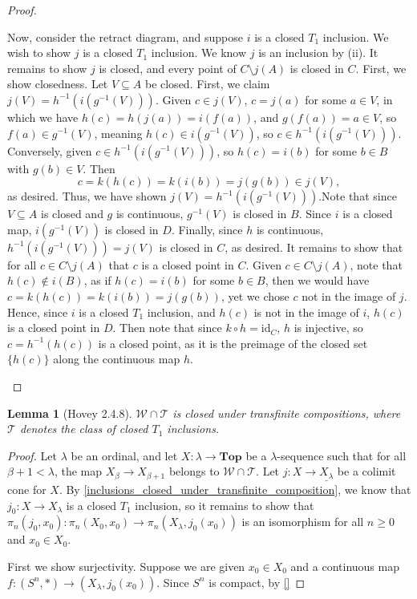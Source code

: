 \documentclass{amsart}
\theoremstyle{plain}
\newtheorem{lemma}[theorem]{Lemma}
\theoremstyle{definition}
\newcommand{\Top}{\mbf{Top}}
\newcommand{\sseq}{\subseteq}
\newcommand{\0}{\mathbf{0}}
\newcommand{\id}{\mathrm{id}}
\newcommand{\cT}{\mathcal T}
\newcommand{\cW}{\mathcal W}
\newcommand{\mbf}[1]{\mathbf{#1}}
\newcommand{\ul}{\underline}
\renewcommand{\(}{\left(}
\renewcommand{\)}{\right)}
\begin{document}
\begin{proof}
\begin{enumerate}[label=(\roman*),listparindent=\parindent,parsep=0pt]
    Now, consider the retract diagram, and suppose $i$ is a closed $T_1$ inclusion. We wish to show $j$ is a closed $T_1$ inclusion. We know $j$ is an inclusion by (ii). It remains to show $j$ is closed, and every point of $C\setminus j(A)$ is closed in $C$. First, we show closedness. Let $V\sseq A$ be closed. First, we claim $j(V)=h^{-1}(i(g^{-1}(V)))$. Given $c\in j(V)$, $c=j(a)$ for some $a\in V$, in which we have $h(c)=h(j(a))=i(f(a))$, and $g(f(a))=a\in V$, so $f(a)\in g^{-1}(V)$, meaning $h(c)\in i(g^{-1}(V))$, so $c\in h^{-1}(i(g^{-1}(V)))$. Conversely, given $c\in h^{-1}(i(g^{-1}(V)))$, so $h(c)=i(b)$ for some $b\in B$ with $g(b)\in V$. Then
    \[c=k(h(c))=k(i(b))=j(g(b))\in j(V),\]
    as desired. Thus, we have shown $j(V)=h^{-1}(i(g^{-1}(V)))$.Note that since $V\sseq A$ is closed and $g$ is continuous, $g^{-1}(V)$ is closed in $B$. Since $i$ is a closed map, $i(g^{-1}(V))$ is closed in $D$. Finally, since $h$ is continuous, $h^{-1}(i(g^{-1}(V)))=j(V)$ is closed in $C$, as desired. It remains to show that for all $c\in C\setminus j(A)$ that $c$ is a closed point in $C$. Given $c\in C\setminus j(A)$, note that $h(c)\notin i(B)$, as if $h(c)=i(b)$ for some $b\in B$, then we would have $c=k(h(c))=k(i(b))=j(g(b))$, yet we chose $c$ not in the image of $j$. Hence, since $i$ is a closed $T_1$ inclusion, and $h(c)$ is not in the image of $i$, $h(c)$ is a closed point in $D$. Then note that since $k\circ h=\id_C$, $h$ is injective, so $c=h^{-1}(h(c))$ is a closed point, as it is the preimage of the closed set $\{h(c)\}$ along the continuous map $h$.\qedhere
  \end{enumerate}
\end{proof}

\begin{lemma}[Hovey 2.4.8]\label{2.4.8}
  $\cW\cap\cT$ is closed under transfinite compositions, where $\cT$ denotes the class of closed $T_1$ inclusions.
\end{lemma}
\begin{proof}
  Let $\lambda$ be an ordinal, and let $X:\lambda\to\Top$ be a $\lambda$-sequence such that for all $\beta+1<\lambda$, the map $X_{\beta}\to X_{\beta+1}$ belongs to $\cW\cap\cT$. Let $j:X\to\ul{X_\lambda}$ be a colimit cone for $X$. By \autoref{inclusions_closed_under_transfinite_composition}, we know that $j_0:X\to X_\lambda$ is a closed $T_1$ inclusion, so it remains to show that $\pi_n(j_0,x_0):\pi_n(X_0,x_0)\to\pi_n(X_\lambda,j_0(x_0))$ is an isomorphism for all $n\geq0$ and $x_0\in X_0$.

  First we show surjectivity. Suppose we are given $x_0\in X_0$ and a continuous map $f:(S^n,\ast)\to(X_\lambda,j_0(x_0))$. Since $S^n$ is compact, by \autoref{}
\end{proof}
\end{document}
